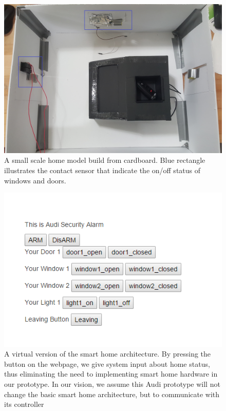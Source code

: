 \begin{figure}[ht]
\label{Fig.SmallHome}
\centering
	\includegraphics[keepaspectratio, width=5in]{Figures/Specifications/SmallHome.jpg}
	\caption{A small scale home model build from cardboard. Blue rectangle illustrates the contact sensor that indicate the on/off status of windows and doors. }
\end{figure}

\begin{figure}[ht]
\label{Fig.VirtualInput}
\centering
	\includegraphics[keepaspectratio, width=5in]{Figures/Specifications/VirtualInput.png}
	\caption{A virtual version of the smart home architecture. By pressing the button on the webpage, we give system input about home status, thus eliminating the need to implementing smart home hardware in our prototype. In our vision, we assume this Audi prototype will not change the basic smart home architecture, but to communicate with its controller}
\end{figure}

